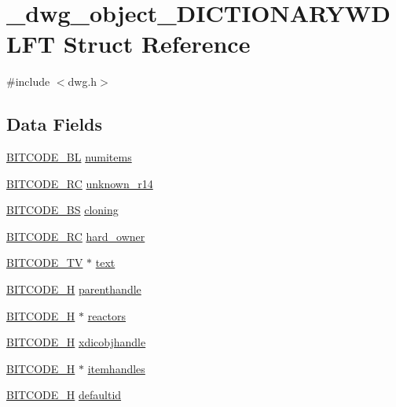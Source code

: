 \hypertarget{struct__dwg__object__DICTIONARYWDLFT}{\section{\-\_\-dwg\-\_\-object\-\_\-\-D\-I\-C\-T\-I\-O\-N\-A\-R\-Y\-W\-D\-L\-F\-T \-Struct \-Reference}
\label{struct__dwg__object__DICTIONARYWDLFT}
}


{\ttfamily \#include $<$dwg.\-h$>$}

\subsection*{\-Data \-Fields}
\begin{DoxyCompactItemize}
\item 
\hyperlink{dwg_8h_aebd5f127038868cbabc3d55d91da776c}{\-B\-I\-T\-C\-O\-D\-E\-\_\-\-B\-L} \hyperlink{struct__dwg__object__DICTIONARYWDLFT_a813a51bef0633a74db757789572288ad}{numitems}
\item 
\hyperlink{dwg_8h_a7fd199a8f9c9cc52bdab220f65a2a619}{\-B\-I\-T\-C\-O\-D\-E\-\_\-\-R\-C} \hyperlink{struct__dwg__object__DICTIONARYWDLFT_a66f0b40e31ca1964f2dbcf396f8d8860}{unknown\-\_\-r14}
\item 
\hyperlink{dwg_8h_a94297606fbd4a4ff97e8add284af0809}{\-B\-I\-T\-C\-O\-D\-E\-\_\-\-B\-S} \hyperlink{struct__dwg__object__DICTIONARYWDLFT_aa9703130ed952d7e158d949dd5a4ec7d}{cloning}
\item 
\hyperlink{dwg_8h_a7fd199a8f9c9cc52bdab220f65a2a619}{\-B\-I\-T\-C\-O\-D\-E\-\_\-\-R\-C} \hyperlink{struct__dwg__object__DICTIONARYWDLFT_afd09f1494f5f3b979a397ed089d44a53}{hard\-\_\-owner}
\item 
\hyperlink{dwg_8h_a2a7e040c6e36ca039b03608679ecaf7c}{\-B\-I\-T\-C\-O\-D\-E\-\_\-\-T\-V} $\ast$ \hyperlink{struct__dwg__object__DICTIONARYWDLFT_a71c4e373512be55a235cd1dde3458f61}{text}
\item 
\hyperlink{dwg_8h_a7c700e94e047a97ba8c24bdfe4029dc3}{\-B\-I\-T\-C\-O\-D\-E\-\_\-\-H} \hyperlink{struct__dwg__object__DICTIONARYWDLFT_a87312ded5aa94b4cf1c72aa9520444a3}{parenthandle}
\item 
\hyperlink{dwg_8h_a7c700e94e047a97ba8c24bdfe4029dc3}{\-B\-I\-T\-C\-O\-D\-E\-\_\-\-H} $\ast$ \hyperlink{struct__dwg__object__DICTIONARYWDLFT_aa771973ef5abb900e7e6105c1843230d}{reactors}
\item 
\hyperlink{dwg_8h_a7c700e94e047a97ba8c24bdfe4029dc3}{\-B\-I\-T\-C\-O\-D\-E\-\_\-\-H} \hyperlink{struct__dwg__object__DICTIONARYWDLFT_adca08618ea6da01298e32e31682dfc52}{xdicobjhandle}
\item 
\hyperlink{dwg_8h_a7c700e94e047a97ba8c24bdfe4029dc3}{\-B\-I\-T\-C\-O\-D\-E\-\_\-\-H} $\ast$ \hyperlink{struct__dwg__object__DICTIONARYWDLFT_a208d6f5c8c8e1c65ddb4d477fd1c4f92}{itemhandles}
\item 
\hyperlink{dwg_8h_a7c700e94e047a97ba8c24bdfe4029dc3}{\-B\-I\-T\-C\-O\-D\-E\-\_\-\-H} \hyperlink{struct__dwg__object__DICTIONARYWDLFT_a7bc4d6b751fd5b29737e904dfcb0a3d2}{defaultid}
\end{DoxyCompactItemize}


